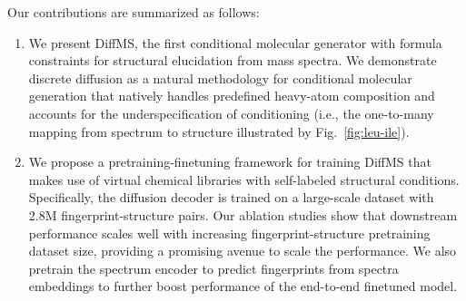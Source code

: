 \documentclass{article}
\theoremstyle{plain}
\theoremstyle{definition}
\theoremstyle{remark}
\newcommand{\ours}{DiffMS\xspace}
\begin{document}
Our contributions are summarized as follows:
\begin{enumerate}
    \item We present \ours, the first conditional molecular generator with formula constraints for structural elucidation from mass spectra. We demonstrate discrete diffusion as a natural methodology for conditional molecular generation that natively handles predefined heavy-atom composition and accounts for the underspecification of conditioning (i.e., the one-to-many mapping from spectrum to structure illustrated by Fig.~\ref{fig:leu-ile}). 
    
    \item We propose a pretraining-finetuning framework for training \ours that makes use of virtual chemical libraries with self-labeled structural conditions. %
    Specifically, the diffusion decoder is trained on a large-scale dataset with 2.8M fingerprint-structure pairs. Our ablation studies show that downstream performance scales well with increasing fingerprint-structure pretraining dataset size, providing a promising avenue to scale the performance. %
    We also pretrain the spectrum encoder to predict fingerprints from spectra embeddings to further boost performance of the end-to-end finetuned model. 
    
    

\end{enumerate}
\end{document}
